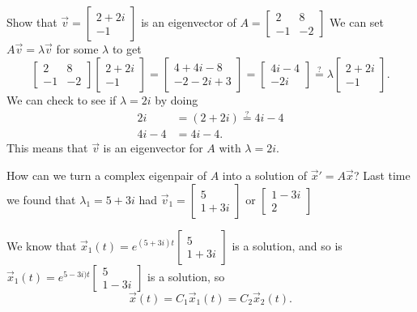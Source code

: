 \begin{eg}
  Show that $\vec{v}=\begin{bmatrix} 2+2i\\-1 \end{bmatrix} $ is an eigenvector of $A=\begin{bmatrix} 2&8\\-1&-2 \end{bmatrix} $ We can set $A\vec{v}=\lambda\vec{v}$ for some $\lambda$ to get \[
  \begin{bmatrix} 2&8\\-1&-2 \end{bmatrix} \begin{bmatrix} 2+2i\\-1 \end{bmatrix} =\begin{bmatrix} 4+4i-8\\-2-2i+3 \end{bmatrix} =\begin{bmatrix} 4i-4\\-2i \end{bmatrix} \stackrel{?}{=}\lambda\begin{bmatrix} 2+2i\\-1 \end{bmatrix} 
  .\] 
  We can check to see if $\lambda=2i$ by doing 
  \begin{align*}
    2i&=(2+2i)\stackrel{?}{=}4i-4\\
    4i-4&=4i-4
  .\end{align*}
  This means that $\vec{v}$ is an eigenvector for $A$ with $\lambda=2i$.
\end{eg}
How can we turn a complex eigenpair of $A$ into a solution of $\vec{x}'=A\vec{x}$? Last time we found that $\lambda_1=5+3i$ had $\vec{v}_1=\begin{bmatrix} 5\\1+3i \end{bmatrix} \text{ or }\begin{bmatrix} 1-3i\\2 \end{bmatrix} $
\begin{note}
  We know that $\vec{x}_1(t)=e^{(5+3i)t}\begin{bmatrix} 5\\1+3i \end{bmatrix} $ is a solution, and so is $\vec{x}_1(t)=e^{5-3i)t}\begin{bmatrix} 5\\1-3i \end{bmatrix} $ is a solution, so \[
  \vec{x}(t)=C_1\vec{x}_1(t)=C_2\vec{x}_2(t)
  .\] 
\end{note}
